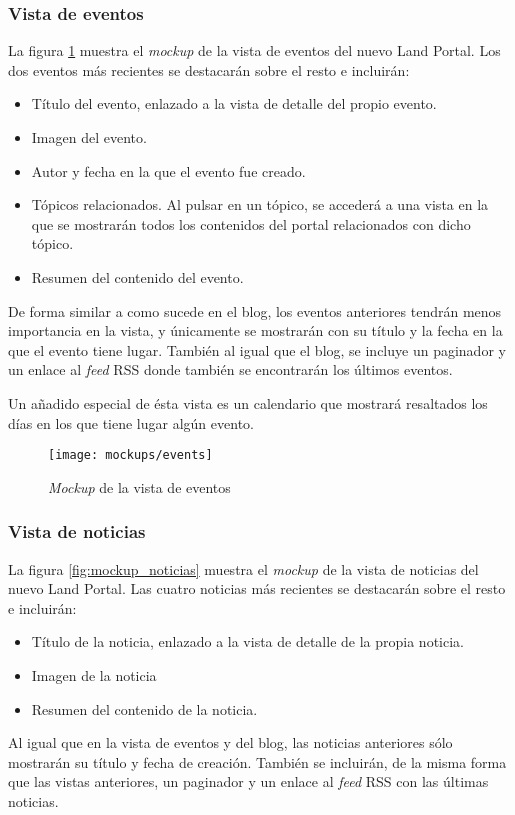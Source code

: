 \subsubsection{Vista de eventos}
\label{chapter04:mockup_eventos}
La figura \ref{fig:mockup_eventos} muestra el \textit{mockup} de la vista de eventos del nuevo Land Portal.  Los dos eventos más recientes se destacarán sobre el resto e incluirán:
\begin{itemize}
	\item Título del evento, enlazado a la vista de detalle del propio evento.
	\item Imagen del evento.
	\item Autor y fecha en la que el evento fue creado.
	\item Tópicos relacionados.  Al pulsar en un tópico, se accederá a una vista en la que se mostrarán todos los contenidos del portal relacionados con dicho tópico.
	\item Resumen del contenido del evento.
\end{itemize}
De forma similar a como sucede en el blog, los eventos anteriores tendrán menos importancia en la vista, y únicamente se mostrarán con su título y la fecha en la que el evento tiene lugar.  También al igual que el blog, se incluye un paginador y un enlace al \textit{feed} RSS donde también se encontrarán los últimos eventos.

Un añadido especial de ésta vista es un calendario que mostrará resaltados los días en los que tiene lugar algún evento.
\begin{figure}[h]
	\centering
	\texttt{[image: mockups/events]}
	\caption{\textit{Mockup} de la vista de eventos}
	\label{fig:mockup_eventos}
\end{figure}


\subsubsection{Vista de noticias}
\label{chapter04:mockup_noticias}
La figura \ref{fig:mockup_noticias} muestra el \textit{mockup} de la vista de noticias del nuevo Land Portal.  Las cuatro noticias más recientes se destacarán sobre el resto e incluirán:
\begin{itemize}
	\item Título de la noticia, enlazado a la vista de detalle de la propia noticia.
	\item Imagen de la noticia
	\item Resumen del contenido de la noticia.
\end{itemize}
Al igual que en la vista de eventos y del blog, las noticias anteriores sólo mostrarán su título y fecha de creación.  También se incluirán, de la misma forma que las vistas anteriores, un paginador y un enlace al \textit{feed} RSS con las últimas noticias.

